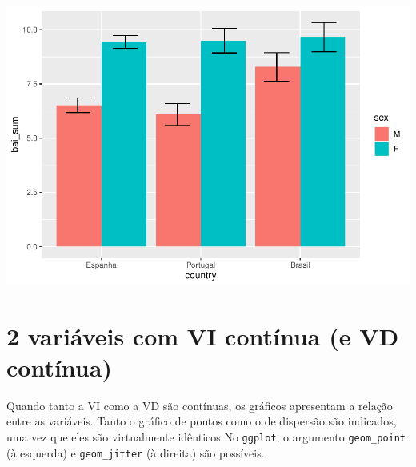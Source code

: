 \documentclass[
]{book}
\newenvironment{Shaded}{\begin{snugshade}}{\end{snugshade}}
\newcommand{\CommentTok}[1]{\textcolor[rgb]{0.56,0.35,0.01}{\textit{#1}}}
\newcommand{\DataTypeTok}[1]{\textcolor[rgb]{0.13,0.29,0.53}{#1}}
\newcommand{\DecValTok}[1]{\textcolor[rgb]{0.00,0.00,0.81}{#1}}
\newcommand{\KeywordTok}[1]{\textcolor[rgb]{0.13,0.29,0.53}{\textbf{#1}}}
\newcommand{\NormalTok}[1]{#1}
\newcommand{\OperatorTok}[1]{\textcolor[rgb]{0.81,0.36,0.00}{\textbf{#1}}}
\newcommand{\StringTok}[1]{\textcolor[rgb]{0.31,0.60,0.02}{#1}}
\begin{document}
\begin{center}\includegraphics{gitbook-demo_files/figure-latex/unnamed-chunk-25-1} \end{center}

\hypertarget{variuxe1veis-com-vi-contuxednua-e-vd-contuxednua}{%
\section{2 variáveis com VI contínua (e VD contínua)}\label{variuxe1veis-com-vi-contuxednua-e-vd-contuxednua}}

Quando tanto a VI como a VD são contínuas, os gráficos apresentam a relação entre as variáveis. Tanto o gráfico de pontos como o de dispersão são indicados, uma vez que eles são virtualmente idênticos No \texttt{ggplot}, o argumento \texttt{geom\_point} (à esquerda) e \texttt{geom\_jitter} (à direita) são possíveis.

\begin{Shaded}
\end{Shaded}
\end{document}
